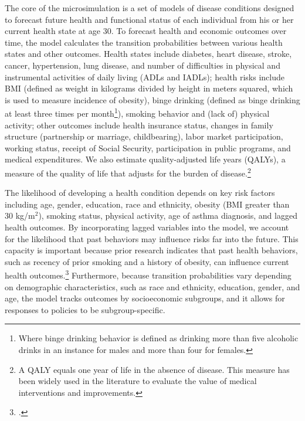 \noindent The core of the microsimulation is a set of models of disease conditions designed to forecast future health and functional status of each individual from his or her current health state at age 30. To forecast health and economic outcomes over time, the model calculates the transition probabilities between various health states and other outcomes. Health states include diabetes, heart disease, stroke, cancer, hypertension, lung disease, and number of difficulties in physical and instrumental activities of daily living (ADLs and IADLs); health risks include BMI (defined as weight in kilograms divided by height in meters squared, which is used to measure incidence of obesity), binge drinking (defined as binge drinking at least three times per month\footnote{Where binge drinking behavior is defined as drinking more than five alcoholic drinks in an instance for males and more than four for females.}), smoking behavior and (lack of) physical activity; other outcomes include health insurance status, changes in family structure (partnership or marriage, childbearing), labor market participation, working status, receipt of Social Security, participation in public programs, and medical expenditures. We also estimate quality-adjusted life years (QALYs), a measure of the quality of life that adjusts for the burden of disease.\footnote{A QALY equals one year of life in the absence of disease. This measure has been widely used in the literature to evaluate the value of medical interventions and improvements.} 

\noindent The likelihood of developing a health condition depends on key risk factors including age, gender, education, race and ethnicity, obesity (BMI greater than 30 kg/m$^2$), smoking status, physical activity, age of asthma diagnosis, and lagged health outcomes. By incorporating lagged variables into the model, we account for the likelihood that past behaviors may influence risks far into the future. This capacity is important because prior research indicates that past health behaviors, such as recency of prior smoking and a history of obesity, can influence current health outcomes.\footnote{\citet{Tong_etal_1996-Lung-Carcinoma,Moore_etal_2008_Past-Body-Mass}.} Furthermore, because transition probabilities vary depending on demographic characteristics, such as race and ethnicity, education, gender, and age, the model tracks outcomes by socioeconomic subgroups, and it allows for responses to policies to be subgroup-specific. 

